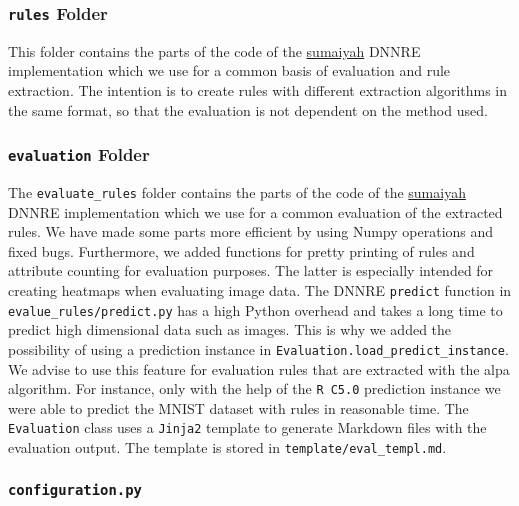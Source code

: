 \documentclass[
]{article}
\begin{document}
\hypertarget{rules-folder}{%
\subsubsection{\texorpdfstring{\texttt{rules}
Folder}{rules Folder}}\label{rules-folder}}

This folder contains the parts of the code of the
\href{https://github.com/sumaiyah/DNN-RE/}{sumaiyah} DNNRE
implementation which we use for a common basis of evaluation and rule
extraction. The intention is to create rules with different extraction
algorithms in the same format, so that the evaluation is not dependent
on the method used.

\hypertarget{evaluation-folder}{%
\subsubsection{\texorpdfstring{\texttt{evaluation}
Folder}{evaluation Folder}}\label{evaluation-folder}}

The \texttt{evaluate\_rules} folder contains the parts of the code of
the \href{https://github.com/sumaiyah/DNN-RE/}{sumaiyah} DNNRE
implementation which we use for a common evaluation of the extracted
rules. We have made some parts more efficient by using Numpy operations
and fixed bugs. Furthermore, we added functions for pretty printing of
rules and attribute counting for evaluation purposes. The latter is
especially intended for creating heatmaps when evaluating image data.
The DNNRE \texttt{predict} function in \texttt{evalue\_rules/predict.py}
has a high Python overhead and takes a long time to predict high
dimensional data such as images. This is why we added the possibility of
using a prediction instance in
\texttt{Evaluation.load\_predict\_instance}. We advise to use this
feature for evaluation rules that are extracted with the alpa algorithm.
For instance, only with the help of the \texttt{R\ C5.0} prediction
instance we were able to predict the MNIST dataset with rules in
reasonable time. The \texttt{Evaluation} class uses a \texttt{Jinja2}
template to generate Markdown files with the evaluation output. The
template is stored in \texttt{template/eval\_templ.md}.

\hypertarget{configuration.py}{%
\subsubsection{\texorpdfstring{\texttt{configuration.py}}{configuration.py}}\label{configuration.py}}
\end{document}
